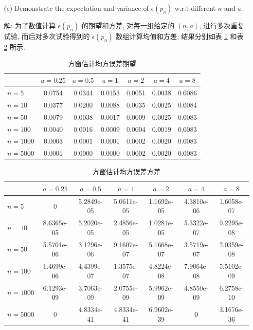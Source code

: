 \documentclass[openany]{ctexbook}
\theoremstyle{kaiti}
\theoremstyle{normal}
\begin{document}
(c) Demonstrate the expectation and variance of $\epsilon(p_n)$ w.r.t different $n$ and $a$.

解: 为了数值计算 $\epsilon(p_n)$ 的期望和方差, 对每一组给定的 $(n,a)$, 进行多次重复试验, 而后对多次试验得到的 $\epsilon(p_n)$ 数组计算均值和方差, 结果分别如表 \ref{tab:squMeanMSE} 和表 \ref{tab:squVarMSE} 所示.

\begin{table}[htbp]
  \centering
  \begin{tabular}{l|cccccc}
  \hline
           & $a=0.25$ & $a=0.5$ & $a=1$  & $a=2$  & $a=4$  & $a=8$  \\ 
  \hline
  $n=5$    & 0.0754   & 0.0344  & 0.0153 & 0.0051 & 0.0038 & 0.0086 \\
  $n=10$   & 0.0377   & 0.0200  & 0.0088 & 0.0035 & 0.0025 & 0.0084 \\
  $n=50$   & 0.0079   & 0.0038  & 0.0017 & 0.0009 & 0.0025 & 0.0083 \\
  $n=100$  & 0.0040   & 0.0016  & 0.0009 & 0.0004 & 0.0019 & 0.0083 \\
  $n=1000$ & 0.0003   & 0.0001  & 0.0001 & 0.0002 & 0.0020 & 0.0083 \\
  $n=5000$ & 0.0001   & 0.0000  & 0.0000 & 0.0002 & 0.0020 & 0.0083 \\ 
  \hline
  \end{tabular}
  \caption{方窗估计均方误差期望}
  \label{tab:squMeanMSE}
\end{table}

\begin{table}[htbp]
  \centering
  \begin{tabular}{l|cccccc}
  \hline
           & $a=0.25$   & $a=0.5$    & $a=1$      & $a=2$      & $a=4$      & $a=8$      \\ \hline
  $n=5$    & 0          & 5.2849e-05 & 5.0611e-05 & 1.1692e-05 & 4.3810e-06 & 1.6058e-07 \\
  $n=10$   & 8.6365e-05 & 5.2020e-05 & 2.4856e-05 & 1.0281e-05 & 5.3322e-07 & 9.2295e-08 \\
  $n=50$   & 5.5701e-06 & 3.1296e-06 & 9.1607e-07 & 5.1668e-07 & 3.5719e-07 & 2.0359e-08 \\
  $n=100$  & 1.4699e-06 & 4.4399e-07 & 1.3575e-07 & 4.8224e-08 & 7.9064e-08 & 5.5102e-09 \\
  $n=1000$ & 6.1293e-09 & 3.7063e-09 & 2.0755e-09 & 5.9962e-09 & 4.8550e-09 & 6.2758e-10 \\
  $n=5000$ & 0          & 4.8334e-41 & 4.8334e-41 & 6.9602e-39 & 0          & 3.1676e-36 \\ \hline
  \end{tabular}
  \caption{方窗估计均方误差方差}
  \label{tab:squVarMSE}
\end{table}
\end{document}

